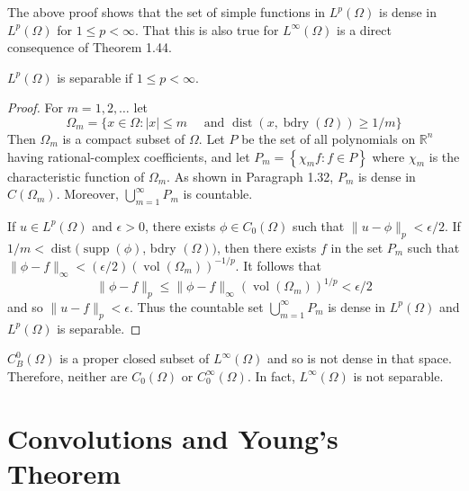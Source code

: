 \begin{para}
  The above proof shows that the set of simple functions in $L^p(\Omega)$ is dense in $L^p(\Omega)$ for $1 \leq p<\infty$. That this is also true for $L^{\infty}(\Omega)$ is a direct consequence of Theorem 1.44.
\end{para}


\begin{theorem}
  $L^p(\Omega)$ is separable if $1 \leq p<\infty$.
\end{theorem}

\begin{proof}
  For $m=1,2, \ldots$ let
  \[
  \Omega_m=\{x \in \Omega:|x| \leq m \quad \text { and } \operatorname{dist}(x, \operatorname{bdry}(\Omega)) \geq 1 / m\}
  \]
  Then $\Omega_m$ is a compact subset of $\Omega$. Let $P$ be the set of all polynomials on $\mathbb{R}^n$ having rational-complex coefficients, and let $P_m=\left\{\chi_m f: f \in P\right\}$ where $\chi_m$ is the characteristic function of $\Omega_m$. As shown in Paragraph 1.32, $P_m$ is dense in $C\left(\Omega_m\right)$. Moreover, $\bigcup_{m=1}^{\infty} P_m$ is countable.
  
  If $u \in L^p(\Omega)$ and $\epsilon>0$, there exists $\phi \in C_0(\Omega)$ such that $\|u-\phi\|_p<\epsilon / 2$. If $1 / m<\operatorname{dist}(\operatorname{supp}(\phi)$, bdry $(\Omega))$, then there exists $f$ in the set $P_m$ such that $\|\phi-f\|_{\infty}<(\epsilon / 2)\left(\operatorname{vol}\left(\Omega_m\right)\right)^{-1 / p}$. It follows that
  \[
  \|\phi-f\|_p \leq\|\phi-f\|_{\infty}\left(\operatorname{vol}\left(\Omega_m\right)\right)^{1 / p}<\epsilon / 2
  \]
  and so $\|u-f\|_p<\epsilon$. Thus the countable set $\bigcup_{m=1}^{\infty} P_m$ is dense in $L^p(\Omega)$ and $L^p(\Omega)$ is separable.
\end{proof}

\begin{para}
  $C_B^0(\Omega)$ is a proper closed subset of $L^{\infty}(\Omega)$ and so is not dense in that space. Therefore, neither are $C_0(\Omega)$ or $C_0^{\infty}(\Omega)$. In fact, $L^{\infty}(\Omega)$ is not separable.
\end{para}


\section{Convolutions and Young's Theorem}


